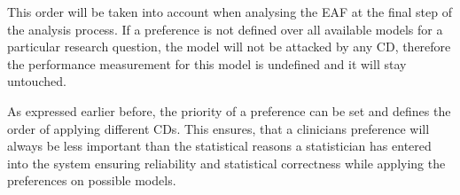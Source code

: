 This order will be taken into account when analysing the \gls{EAF} at the final step of the analysis process. If a preference is not defined over all available models for a particular research question, the model will not be attacked by any \gls{CD}, therefore the performance measurement for this model is undefined and it will stay untouched.

As expressed earlier before, the priority of a preference can be set and defines the order of applying different \glspl{CD}. This ensures, that a clinicians preference will always be less important than the statistical reasons a statistician has entered into the system ensuring reliability and statistical correctness while applying the preferences on possible models.

